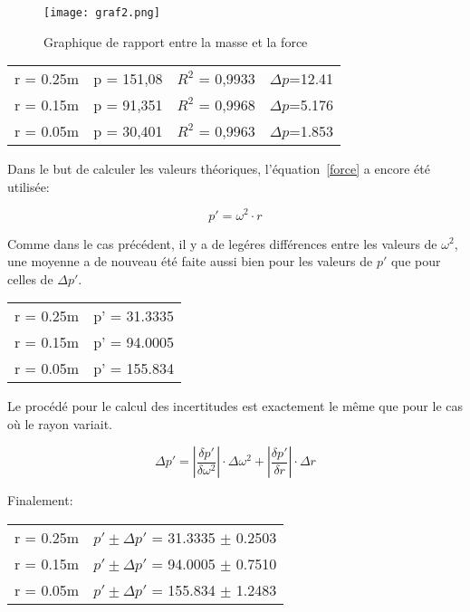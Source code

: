 \begin{figure}[!h]
    \caption[Graphique masse force]{Graphique de rapport entre la masse et la force}
    \centering
    \texttt{[image: graf2.png]}
\end{figure}

\begin{table}[ht]
    \centering
    \begin{tabular}{l l l l}
    r = 0.25m & p = 151,08& $R^2$ = 0,9933 & $\Delta p$=12.41\\
    r = 0.15m & p = 91,351& $R^2$ = 0,9968 & $\Delta p$=5.176\\
    r = 0.05m & p = 30,401& $R^2$ = 0,9963 & $\Delta p$=1.853\\
    \end{tabular}
\end{table}

Dans le but de calculer les valeurs théoriques, l'équation~\eqref{force} a encore été utilisée:

\begin{equation}
    p' = \omega^2 \cdot r
\end{equation}

Comme dans le cas précédent, il y a de legéres différences entre les valeurs de $\omega^2$, une moyenne a de nouveau été faite aussi bien pour les valeurs de $p'$ que pour celles de $\Delta p'$.

\begin{table}[ht]
    \centering
    \begin{tabular}{l l}
	r = 0.25m & p' = 31.3335 \\
	r = 0.15m & p' = 94.0005 \\
	r = 0.05m & p' = 155.834 \\
    \end{tabular}
\end{table}

Le procédé pour le calcul des incertitudes est exactement le même que pour le cas où le rayon variait.

\begin{equation}
    \Delta p' = |\frac{\delta p'}{\delta \omega^2}|\cdot \Delta \omega^2 + |\frac{\delta p'}{\delta r}|\cdot \Delta r
\end{equation}

Finalement:

\begin{table}[ht]
    \centering
    \begin{tabular}{l l}
	r = 0.25m & $p' \pm \Delta p'$ = 31.3335 $\pm$ 0.2503 \\
	r = 0.15m & $p' \pm \Delta p'$ = 94.0005 $\pm$ 0.7510 \\
	r = 0.05m & $p' \pm \Delta p'$ = 155.834 $\pm$ 1.2483 \\
    \end{tabular}
\end{table}

